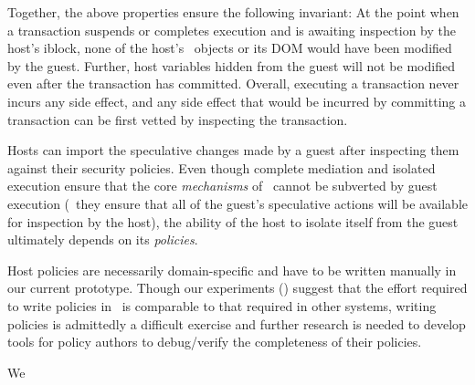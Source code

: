 Together, the above properties ensure the following invariant: At the point
when a transaction suspends or completes execution and is awaiting inspection
by the host's iblock, none of the host's \js\ objects or its DOM would have
been modified by the guest. Further, host variables hidden from the guest will
not be modified even after the transaction has committed.  Overall, executing a
transaction never incurs any side effect, and any side effect that would be
incurred by committing a transaction can be first vetted by inspecting the
transaction.

\label{section:analysis:bestpractice}

Hosts can import the speculative changes made by a guest after inspecting them
against their security policies. Even though complete mediation and isolated
execution ensure that the core \textit{mechanisms} of \txjs\ cannot be
subverted by guest execution (\ie~they ensure that all of the guest's
speculative actions will be available for inspection by the host), the ability
of the host to isolate itself from the guest ultimately depends on its
\textit{policies}. 

Host policies are necessarily domain-specific and have to be written manually
in our current prototype. Though our experiments
() suggest that the effort required to write
policies in \txjs\ is comparable to that required in other systems, writing
policies is admittedly a difficult exercise and further research is needed to
develop tools for policy authors to debug/verify the completeness of their
policies. 

We 


